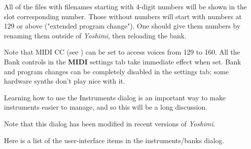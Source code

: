    All of the files with filenames starting with 4-digit numbers will be
   shown in the slot corresponding number.  Those without numbers will start
   with numbers at 129 or above ("extended program change").  One should give
   them numbers by renaming them outside of \textsl{Yoshimi}, then reloading
   the bank.

   Note that MIDI CC
   (see )
   can be set to access voices from 129 to 160.
   All the Bank controls in the \textbf{MIDI} settings tab take immediate
   effect when set.
   Bank and program changes can be completely disabled in the settings tab;
   some hardware synths don't play nice with it.

   Learning how to use the Instruments dialog is an important way to make
   instruments easier to manage, and so this will be a long discussion.




   


   Note that this dialog has been modified in recent versions of
   \textsl{Yoshimi}.

   Here is a list of the user-interface items in the instruments/banks dialog.


